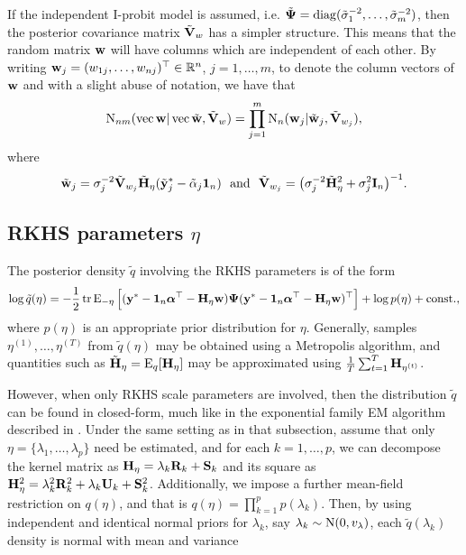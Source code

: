 If the independent I-probit model is assumed, i.e. $\tilde{{\bm\Psi}} = \operatorname{diag}(\tilde\sigma_1^{-2},\dots,\tilde\sigma_m^{-2})$, then the posterior covariance matrix $\tilde{{\mathbf V}}_w$ has a simpler structure.
This means that the random matrix ${\mathbf w}$ will have columns which are independent of each other.
By writing ${\mathbf w}_j = (w_{1j},\dots,w_{nj})^\top \in \mathbb{R}^n$, $j=1,\dots,m$, to denote the column vectors of ${\mathbf w}$ and with a slight abuse of notation, we have that
\begin{align*}
  \operatorname{N}_{nm}(\operatorname{vec} {\mathbf w}|\operatorname{vec}\tilde{\mathbf w}, \tilde{{\mathbf V}}_w) 
  = \prod_{j=1}^m \operatorname{N}_{n}({\mathbf w}_j|\tilde{{\mathbf w}}_j, \tilde{{\mathbf V}}_{w_j}),
\end{align*}
where 
\[
  \tilde {{\mathbf w}}_j = \sigma_j^{-2}\tilde {{\mathbf V}}_{w_j}\tilde{{\mathbf H}}_\eta (\tilde{{\mathbf y}}^*_j - \tilde\alpha_j{\mathbf 1}_n) \ \text{ and } \ \tilde {{\mathbf V}}_{w_j} = \big(\sigma_j^{-2}\tilde{{\mathbf H}}_{\eta}^2 + \sigma_j^{2}{\mathbf I}_n \big)^{-1}.
\]

\subsection[RKHS parameters eta]{RKHS parameters $\eta$}

The posterior density $\tilde q$ involving the RKHS parameters is of the form
\[
  \log\tilde q(\eta) =  -\frac{1}{2}\operatorname{tr}\operatorname{E}_{-\eta} \Big[ 
  ({\mathbf y}^* - {\mathbf 1}_n{\bm\alpha}^\top - {\mathbf H}_\eta{\mathbf w}) {\bm\Psi} ({\mathbf y}^* - {\mathbf 1}_n{\bm\alpha}^\top - {\mathbf H}_\eta{\mathbf w})^\top \Big] + \log p(\eta) + \text{const.}\hspace{0.01em},
\]
where $p(\eta)$ is an appropriate prior distribution for $\eta$.
Generally, samples $\eta^{(1)},\dots,\eta^{(T)}$ from $\tilde q(\eta)$ may be obtained using a Metropolis algorithm, and quantities such as $\tilde{{\mathbf H}}_{\eta} = \operatorname{E}_q[{\mathbf H}_{\eta}]$ may be approximated using $\frac{1}{T}\sum_{t=1}^T {\mathbf H}_{\eta^{(t)}}$.

However, when only RKHS scale parameters are involved, then the distribution $\tilde q$ can be found in closed-form, much like in the exponential family EM algorithm described in .
Under the same setting as in that subsection, assume that only $\eta = \{\lambda_1,\dots,\lambda_p\}$ need be estimated, and for each $k=1,\dots,p$, we can decompose the kernel matrix as ${\mathbf H}_\eta = \lambda_k {\mathbf R}_k + {\mathbf S}_k$ and its square as ${\mathbf H}_\eta^2 = \lambda_k^2 {\mathbf R}_k^2 + \lambda_k {\mathbf U}_k + {\mathbf S}_k^2$.
Additionally, we impose a further mean-field restriction on $q(\eta)$, and that is $q(\eta) = \prod_{k=1}^p p(\lambda_k)$.
Then, by using independent and identical normal priors for $\lambda_k$, say $\lambda_k \sim \operatorname{N}(0,v_\lambda)$, each $\tilde q(\lambda_k)$ density is normal with mean and variance

